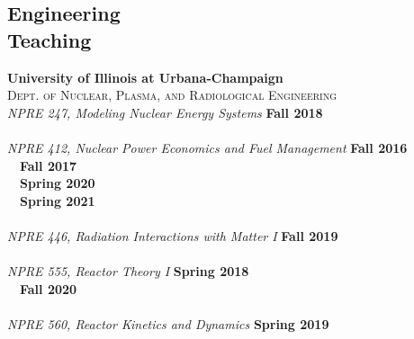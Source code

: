 \documentclass[margin,line]{resume}
\begin{document}
\begin{resume}
    \section{\mysidestyle Engineering\\Teaching}
    \textbf{University of Illinois at Urbana-Champaign}\\
    \textsc{Dept. of Nuclear, Plasma, and Radiological Engineering}\\
               \textsl{NPRE 247, Modeling Nuclear Energy Systems} \hfill \textbf{Fall 2018}\\
               \vspace{2mm}\\
               \textsl{NPRE 412, Nuclear Power Economics and Fuel Management} \hfill \textbf{Fall 2016}\\
               \mbox{ }~\hfill \textbf{Fall 2017}\\
               \mbox{ }~\hfill \textbf{Spring 2020}\\
               \mbox{ }~\hfill \textbf{Spring 2021}\\
               \vspace{2mm}\\
               \textsl{NPRE 446, Radiation Interactions with Matter I} \hfill \textbf{Fall 2019}\\
               \vspace{2mm}\\
               \textsl{NPRE 555, Reactor Theory I} \hfill \textbf{Spring 2018}\\
               \mbox{ }~\hfill \textbf{Fall 2020}\\
               \vspace{2mm}\\
               \textsl{NPRE 560, Reactor Kinetics and Dynamics} \hfill \textbf{Spring 2019}\\

\end{resume}
\end{document}
